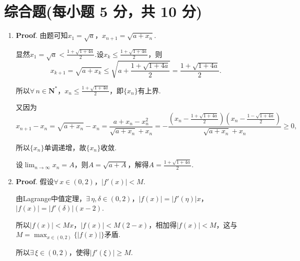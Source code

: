 \documentclass[../Main.tex]{subfiles}
\begin{document}
  \section{综合题(每小题 5 分，共 10 分)}
  \begin{enumerate}
    \item[19.] \textbf{Proof}. 由题可知$x_{1}=\sqrt{a}$，$x_{n+1}=\sqrt{a+x_{n}}$.

      显然$x_{1}=\sqrt{a}<\frac{1+\sqrt{1+4a}}{2}$.设$x_{k}\leq\frac{1+\sqrt{1+4a}}{2}$，则
      \[
        x_{k+1}=\sqrt{a+x_{k}}\leq\sqrt{a+\frac{1+\sqrt{1+4a}}{2}}=\frac{1+\sqrt{1+4a}}{2}
        .
      \]

      所以$\forall\,n\in\mathbf{N}^{*}$，$x_{n}\leq\frac{1+\sqrt{1+4a}}{2}$，即$\{
      x_{n}\}$有上界.

      又因为
      \[
        x_{n+1}-x_{n}=\sqrt{a+x_{n}}-x_{n}=\frac{a+x_{n}-x_{n}^{2}}{\sqrt{a+x_n}+x_{n}}
        =-\frac{(x_{n}-\frac{1+\sqrt{1+4a}}{2})(x_{n}-\frac{1-\sqrt{1+4a}}{2})}{\sqrt{a+x_n}+x_{n}}
        \geq0,
      \]

      所以$\{x_{n}\}$单调递增，故$\{x_{n}\}$收敛.

      设$\lim_{n\to\infty}x_{n}=A$，则$A=\sqrt{a+A}$，解得$A=\frac{1+\sqrt{1+4a}}{2}$.

    \item[20.] \textbf{Proof}. 假设$\forall\,x\in(0,2)$，$|f'(x)|<M$.

      由Lagrange中值定理，$\exists\,\eta,\delta\in\left(0,2\right)$，$|f(x)|=|f'(
      \eta)|x$，$|f(x)|=|f'(\delta)|(x-2)$.

      所以$|f(x)|<Mx$，$|f(x)|<M(2-x)$，相加得$|f(x)|<M$，这与$M=\max_{x\in(0,2)}
      \{|f(x)|\}$矛盾.

      所以$\exists\,\xi\in(0,2)$，使得$|f'(\xi)|\geq M$.
  \end{enumerate}
\end{document}
